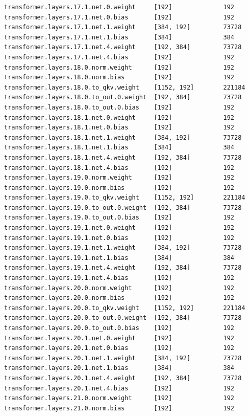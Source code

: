 \documentclass[notitlepage,cs4size,punct,oneside]{ctexrep}
\numberwithin{equation}{chapter}
\theoremstyle{mystyle}
\begin{document}
\begin{appendices}
{\begin{lstlisting}[style=output]
transformer.layers.17.1.net.0.weight     [192]              192
transformer.layers.17.1.net.0.bias       [192]              192
transformer.layers.17.1.net.1.weight     [384, 192]         73728
transformer.layers.17.1.net.1.bias       [384]              384
transformer.layers.17.1.net.4.weight     [192, 384]         73728
transformer.layers.17.1.net.4.bias       [192]              192
transformer.layers.18.0.norm.weight      [192]              192
transformer.layers.18.0.norm.bias        [192]              192
transformer.layers.18.0.to_qkv.weight    [1152, 192]        221184
transformer.layers.18.0.to_out.0.weight  [192, 384]         73728
transformer.layers.18.0.to_out.0.bias    [192]              192
transformer.layers.18.1.net.0.weight     [192]              192
transformer.layers.18.1.net.0.bias       [192]              192
transformer.layers.18.1.net.1.weight     [384, 192]         73728
transformer.layers.18.1.net.1.bias       [384]              384
transformer.layers.18.1.net.4.weight     [192, 384]         73728
transformer.layers.18.1.net.4.bias       [192]              192
transformer.layers.19.0.norm.weight      [192]              192
transformer.layers.19.0.norm.bias        [192]              192
transformer.layers.19.0.to_qkv.weight    [1152, 192]        221184
transformer.layers.19.0.to_out.0.weight  [192, 384]         73728
transformer.layers.19.0.to_out.0.bias    [192]              192
transformer.layers.19.1.net.0.weight     [192]              192
transformer.layers.19.1.net.0.bias       [192]              192
transformer.layers.19.1.net.1.weight     [384, 192]         73728
transformer.layers.19.1.net.1.bias       [384]              384
transformer.layers.19.1.net.4.weight     [192, 384]         73728
transformer.layers.19.1.net.4.bias       [192]              192
transformer.layers.20.0.norm.weight      [192]              192
transformer.layers.20.0.norm.bias        [192]              192
transformer.layers.20.0.to_qkv.weight    [1152, 192]        221184
transformer.layers.20.0.to_out.0.weight  [192, 384]         73728
transformer.layers.20.0.to_out.0.bias    [192]              192
transformer.layers.20.1.net.0.weight     [192]              192
transformer.layers.20.1.net.0.bias       [192]              192
transformer.layers.20.1.net.1.weight     [384, 192]         73728
transformer.layers.20.1.net.1.bias       [384]              384
transformer.layers.20.1.net.4.weight     [192, 384]         73728
transformer.layers.20.1.net.4.bias       [192]              192
transformer.layers.21.0.norm.weight      [192]              192
transformer.layers.21.0.norm.bias        [192]              192

\end{lstlisting}}
\end{appendices}
\end{document}
